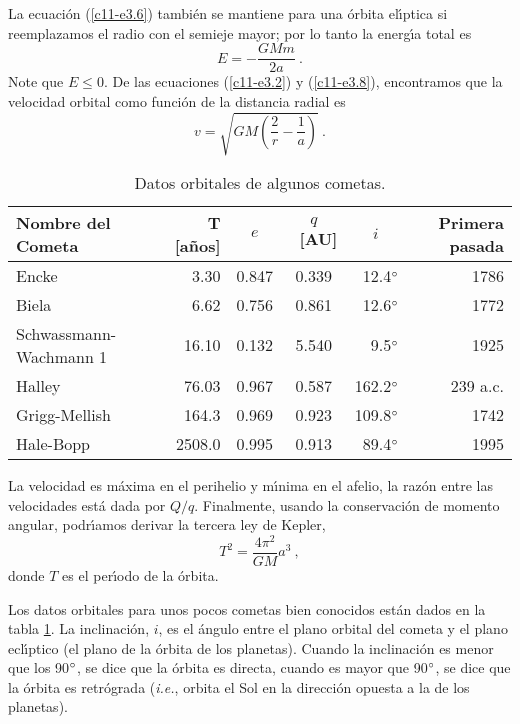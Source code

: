 La ecuaci{\'o}n (\ref{c11-e3.6}) tambi{\'e}n se mantiene para una {\'o}rbita
el{\'\i}ptica si reemplazamos el radio con el semieje mayor; por lo tanto
la energ{\'\i}a total es
\begin{equation}
\label{c11-e3.8}
E=-\frac{GMm}{2a}\ .
\end{equation}
Note que $E\leq0$. De las ecuaciones (\ref{c11-e3.2}) y
(\ref{c11-e3.8}), encontramos que la velocidad orbital como funci{\'o}n de
la distancia radial es
\begin{equation}
\label{c11-e3.9}
v=\sqrt{GM \left( \frac{2}{r}-\frac{1}{a}\right)}\ .
\end{equation}

\begin{table}
\begin{center}
\begin{tabular}{lrccrr}
\hline
Nombre del Cometa & T [a{\~n}os] & $e$ & $q$~[AU] & $i\phantom{Aa}$ & Primera pasada\\
\hline 
Encke & 3.30 & 0.847&0.339 & 12.4$^\circ$ & 1786 \\
Biela & 6.62 & 0.756 & 0.861 & 12.6$^\circ$ & 1772 \\
Schwassmann-Wachmann 1 & 16.10 & 0.132 & 5.540 & 9.5$^\circ$ & 1925\\
Halley & 76.03 & 0.967 & 0.587 & 162.2$^\circ$ & 239 {\sc a.c.}\\
Grigg-Mellish & 164.3 & 0.969 & 0.923 & 109.8$^\circ$ & 1742\\
Hale-Bopp & 2508.0 & 0.995 & 0.913 & 89.4$^\circ$ & 1995 \\ \hline
\end{tabular}
\caption{ Datos orbitales de algunos cometas.}\label{c11-t1}
\end{center}
\end{table}
La velocidad es m{\'a}xima en el perihelio y m{\'\i}nima en el afelio, la raz{\'o}n
entre las velocidades est{\'a} dada por $Q/q$. Finalmente, usando la
conservaci{\'o}n de momento angular, podr{\'\i}amos derivar la tercera ley de
Kepler,
\begin{equation}
\label{c11-e3.10}
T^2=\frac{4\pi^2}{GM}a^3\ ,
\end{equation}
donde $T$ es el per{\'\i}odo de la {\'o}rbita.  

Los datos orbitales para unos pocos cometas bien conocidos est{\'a}n dados
en la tabla \ref{c11-t1}. La inclinaci{\'o}n, $i$, es el {\'a}ngulo entre el
plano orbital del cometa y el plano ecl{\'\i}ptico (el plano de la {\'o}rbita
de los planetas). Cuando la inclinaci{\'o}n es menor que los 90$^\circ$,
se dice que la {\'o}rbita es directa, cuando es mayor que 90$^\circ$, se
dice que la {\'o}rbita es retr{\'o}grada ({\it i.e.}, orbita el Sol en la
direcci{\'o}n opuesta a la de los planetas).

